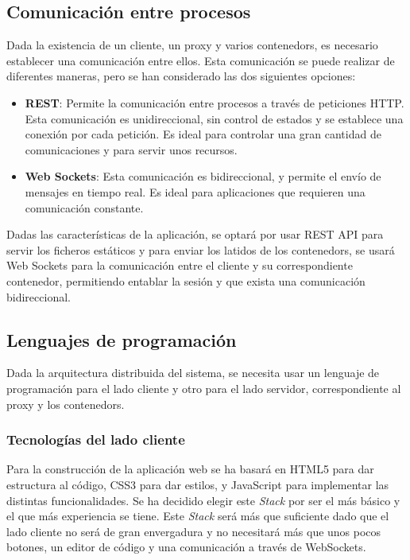 \subsection{Comunicación entre procesos} \label{subsec:comunicacion-procesos}

Dada la existencia de un cliente, un \gls{proxy} y varios \glspl{contenedor}, es necesario establecer una comunicación entre ellos. Esta comunicación se puede realizar de diferentes maneras, pero se han considerado las dos siguientes opciones: 

\begin{itemize}
    \item \textbf{REST}: Permite la comunicación entre procesos a través de peticiones \gls{HTTP}. Esta comunicación es unidireccional, sin control de estados y se establece una conexión por cada petición. Es ideal para controlar una gran cantidad de comunicaciones y para servir unos recursos.
    \item \textbf{Web Sockets}: Esta comunicación es bidireccional, y permite el envío de mensajes en tiempo real. Es ideal para aplicaciones que requieren una comunicación constante.
\end{itemize}

Dadas las características de la aplicación, se optará por usar REST API para servir los ficheros estáticos y para enviar los latidos de los \glspl{contenedor}, se usará Web Sockets para la comunicación entre el cliente y su correspondiente contenedor, permitiendo entablar la sesión y que exista una comunicación bidireccional. 

\subsection{Lenguajes de programación} \label{sec:programacion}

Dada la arquitectura distribuida del sistema, se necesita usar un lenguaje de programación para el lado cliente y otro para el lado servidor, correspondiente al proxy y los \glspl{contenedor}.

\subsubsection{Tecnologías del lado cliente} \label{subsubsec:tecnologias-cliente}

Para la construcción de la aplicación web se ha basará en HTML5 para dar estructura al código, CSS3 para dar estilos, y JavaScript para implementar las distintas funcionalidades. Se ha decidido elegir este \textit{Stack} por ser el más básico y el que más experiencia se tiene. Este \textit{Stack} será más que suficiente dado que el lado cliente no será de gran envergadura y no necesitará más que unos pocos botones, un editor de código y una comunicación a través de WebSockets.


